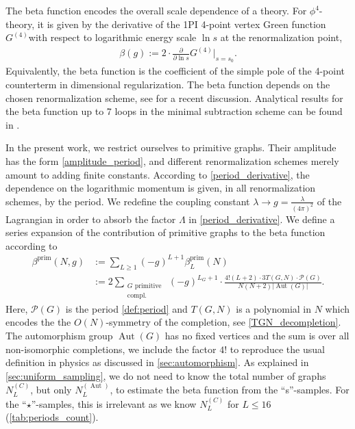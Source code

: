 \documentclass[12pt,a4paper]{article}
\newcommand{\abs}[1]{\lvert #1 \rvert}
\newcommand{\period}{\mathcal P}
\newcommand{\Aut}{\operatorname{Aut}}
\renewcommand{\|}{\rule[-0.4ex]{0.2ex}{1.2em}}
\begin{document}
The beta function encodes the overall scale dependence of a theory. For $\phi^4$-theory, it is given by the derivative of the 1PI 4-point vertex Green function $G^{(4)}$with respect to logarithmic energy scale $\ln s$ at the renormalization point, 
\begin{align*}
\beta(g) := 2\cdot \frac{\partial}{\partial \ln s}G^{(4)} \Big|_{s=s_0}.
\end{align*}
Equivalently, the beta function is the coefficient of the simple pole of the 4-point counterterm in dimensional regularization. The beta function depends on the chosen renormalization scheme, see \cite{balduf_dyson_2023} for a recent discussion. Analytical results for the beta function up to 7 loops in the  minimal subtraction scheme can be found in \cite{schnetz_numbers_2018,schnetz_phi_2023}.

In the present work, we restrict ourselves to  primitive graphs. 
Their amplitude has the form \cref{amplitude_period}, and different renormalization schemes merely amount to adding finite constants. According to \cref{period_derivative}, the dependence on the logarithmic momentum is given, in all renormalization schemes, by the period. We redefine the coupling constant $\lambda\rightarrow g=\frac{\lambda}{(4\pi)^2}$ of the Lagrangian  in order to absorb the factor $\Lambda$ in \cref{period_derivative}. 
We define a series expansion of the contribution of primitive graphs to the beta function according to
\begin{align}\label{beta_expansion}
	\beta^{\text{prim}}(N,g) &:=   \sum_{L \geq 1} (-g)^{L+1} \beta^{\text{prim}}_{L}(N) \nonumber\\ &:=  2\sum_{ \substack{G \text{ primitive }\\ \text{compl.}}  } (-g)^{L_G+1}\cdot \frac{ 4!(L+2) \cdot 3T(G,N)\cdot \period (G)}{N(N+2)\abs{\Aut(G)}}.
\end{align}
Here, $\period(G)$ is the period \cref{def:period} and $T(G,N)$ is a polynomial in $N$ which encodes the the $O(N)$-symmetry of the completion, see \cref{TGN_decompletion}. The automorphism group $\Aut(G)$ has no fixed vertices and the sum is over all non-isomorphic completions, we include the factor $4!$ to reproduce the usual definition in physics as discussed in \cref{sec:automorphism}. As explained in \cref{sec:uniform_sampling}, we do not need to know the total number of graphs $N^{(C)}_L$, but only $N^{(\Aut)}_L$, to estimate the beta function from the \enquote{s}-samples. For the \enquote{$\star$}-samples, this is irrelevant as we know $N^{(C)}_L$ for $L\leq 16$ (\cref{tab:periods_count}).
\end{document}
